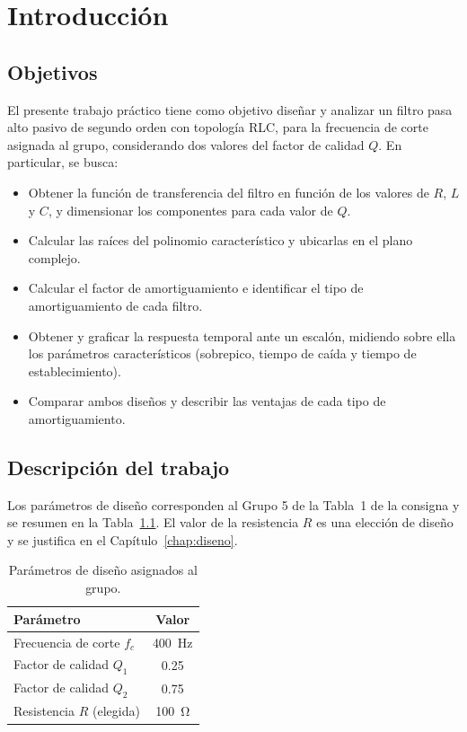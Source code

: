 \chapter{Introducción}

\section{Objetivos}

El presente trabajo práctico tiene como objetivo diseñar y analizar un filtro pasa alto pasivo de segundo
orden con topología RLC, para la frecuencia de corte asignada al grupo, considerando dos valores del factor
de calidad $Q$. En particular, se busca:

\begin{itemize}
  \item Obtener la función de transferencia del filtro en función de los valores de $R$, $L$ y $C$, y
        dimensionar los componentes para cada valor de $Q$.
  \item Calcular las raíces del polinomio característico y ubicarlas en el plano complejo.
  \item Calcular el factor de amortiguamiento e identificar el tipo de amortiguamiento de cada filtro.
  \item Obtener y graficar la respuesta temporal ante un escalón, midiendo sobre ella los parámetros
        característicos (sobrepico, tiempo de caída y tiempo de establecimiento).
  \item Comparar ambos diseños y describir las ventajas de cada tipo de amortiguamiento.
\end{itemize}

\section{Descripción del trabajo}

Los parámetros de diseño corresponden al Grupo 5 de la Tabla~1 de la consigna y se resumen en la
Tabla~\ref{tab:parametros}. El valor de la resistencia $R$ es una elección de diseño y se justifica en el
Capítulo~\ref{chap:diseno}.

\begin{table}[!ht]
  \centering
  \begin{tabular}{|l|c|}
    \hline
    Parámetro & Valor \\
    \hline
    Frecuencia de corte $f_c$ & \qty{400}{\hertz} \\
    Factor de calidad $Q_1$   & \num{0.25} \\
    Factor de calidad $Q_2$   & \num{0.75} \\
    Resistencia $R$ (elegida) & \qty{100}{\ohm} \\
    \hline
  \end{tabular}
  \caption{Parámetros de diseño asignados al grupo.}
  \label{tab:parametros}
\end{table}

